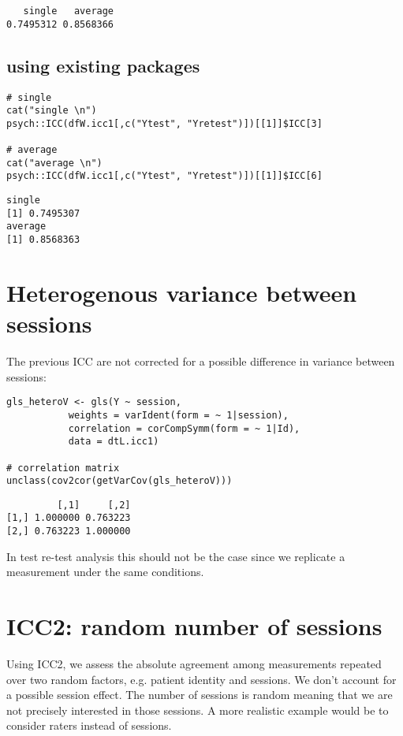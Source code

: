 \documentclass[12pt]{article}
\begin{document}
\begin{verbatim}
   single   average 
0.7495312 0.8568366
\end{verbatim}


\subsection{using existing packages}
\label{sec:org3c1fbf4}
\lstset{language=r,label= ,caption= ,captionpos=b,numbers=none}
\begin{lstlisting}
# single
cat("single \n")
psych::ICC(dfW.icc1[,c("Ytest", "Yretest")])[[1]]$ICC[3]

# average
cat("average \n")
psych::ICC(dfW.icc1[,c("Ytest", "Yretest")])[[1]]$ICC[6]
\end{lstlisting}

\begin{verbatim}
single
[1] 0.7495307
average
[1] 0.8568363
\end{verbatim}

\section{Heterogenous variance between sessions}
\label{sec:orgac12914}

The previous ICC are not corrected for a possible difference in
variance between sessions:
\lstset{language=r,label= ,caption= ,captionpos=b,numbers=none}
\begin{lstlisting}
gls_heteroV <- gls(Y ~ session, 
		   weights = varIdent(form = ~ 1|session),
		   correlation = corCompSymm(form = ~ 1|Id), 
		   data = dtL.icc1)

# correlation matrix
unclass(cov2cor(getVarCov(gls_heteroV)))
\end{lstlisting}

\begin{verbatim}
         [,1]     [,2]
[1,] 1.000000 0.763223
[2,] 0.763223 1.000000
\end{verbatim}

In test re-test analysis this should not be the case since we
replicate a measurement under the same conditions.

\clearpage


\section{ICC2: random number of sessions}
\label{sec:org1b8d2d6}

Using ICC2, we assess the absolute agreement among measurements
repeated over two random factors, e.g. patient identity and
sessions. We don't account for a possible session effect. The number
of sessions is random meaning that we are not precisely interested in
those sessions. A more realistic example would be to consider raters
instead of sessions.
\end{document}
